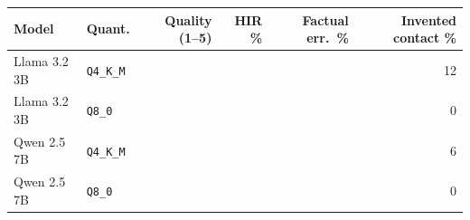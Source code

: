 \begin{tabular}{llrrrr}
\toprule
Model & Quant. & Quality (1--5) & HIR \% & Factual err.\ \% & Invented contact \% \\
\midrule
Llama 3.2 3B & \texttt{Q4\_K\_M} & \tbd{} & \tbd{} & \tbd{} & 12 \\
Llama 3.2 3B & \texttt{Q8\_0} & \tbd{} & \tbd{} & \tbd{} & 0 \\
Qwen 2.5 7B & \texttt{Q4\_K\_M} & \tbd{} & \tbd{} & \tbd{} & 6 \\
Qwen 2.5 7B & \texttt{Q8\_0} & \tbd{} & \tbd{} & \tbd{} & 0 \\
\bottomrule
\end{tabular}
